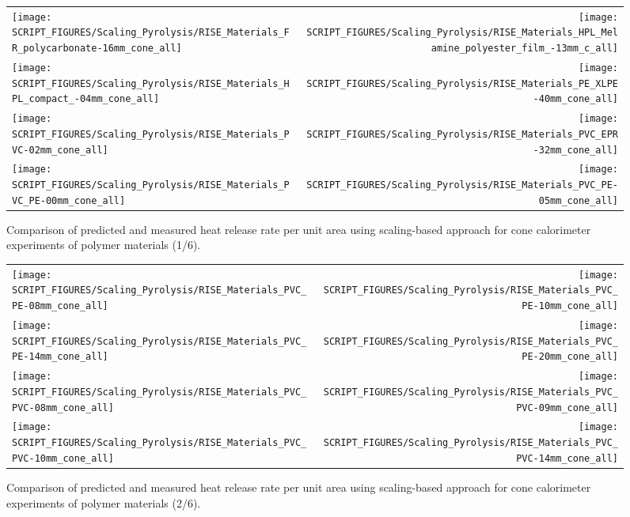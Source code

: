 \begin{figure}[!h]
\begin{tabular*}{\textwidth}{l@{\extracolsep{\fill}}r}
\texttt{[image: SCRIPT\_FIGURES/Scaling\_Pyrolysis/RISE\_Materials\_FR\_polycarbonate-16mm\_cone\_all]} &
\texttt{[image: SCRIPT\_FIGURES/Scaling\_Pyrolysis/RISE\_Materials\_HPL\_Melamine\_polyester\_film\_-13mm\_c\_all]} \\
\texttt{[image: SCRIPT\_FIGURES/Scaling\_Pyrolysis/RISE\_Materials\_HPL\_compact\_-04mm\_cone\_all]} &
\texttt{[image: SCRIPT\_FIGURES/Scaling\_Pyrolysis/RISE\_Materials\_PE\_XLPE-40mm\_cone\_all]} \\
\texttt{[image: SCRIPT\_FIGURES/Scaling\_Pyrolysis/RISE\_Materials\_PVC-02mm\_cone\_all]} &
\texttt{[image: SCRIPT\_FIGURES/Scaling\_Pyrolysis/RISE\_Materials\_PVC\_EPR-32mm\_cone\_all]} \\
\texttt{[image: SCRIPT\_FIGURES/Scaling\_Pyrolysis/RISE\_Materials\_PVC\_PE-00mm\_cone\_all]} &
\texttt{[image: SCRIPT\_FIGURES/Scaling\_Pyrolysis/RISE\_Materials\_PVC\_PE-05mm\_cone\_all]} \\
\end{tabular*}
\caption[Heat release rate per unit area of RISE materials using scaling model, polymer materials]
{Comparison of predicted and measured heat release rate per unit area using scaling-based approach for cone calorimeter experiments of polymer materials (1/6).}
\label{RISE_Materials_polymers1}
\end{figure}

\begin{figure}[!h]
\begin{tabular*}{\textwidth}{l@{\extracolsep{\fill}}r}
\texttt{[image: SCRIPT\_FIGURES/Scaling\_Pyrolysis/RISE\_Materials\_PVC\_PE-08mm\_cone\_all]} &
\texttt{[image: SCRIPT\_FIGURES/Scaling\_Pyrolysis/RISE\_Materials\_PVC\_PE-10mm\_cone\_all]} \\
\texttt{[image: SCRIPT\_FIGURES/Scaling\_Pyrolysis/RISE\_Materials\_PVC\_PE-14mm\_cone\_all]} &
\texttt{[image: SCRIPT\_FIGURES/Scaling\_Pyrolysis/RISE\_Materials\_PVC\_PE-20mm\_cone\_all]} \\
\texttt{[image: SCRIPT\_FIGURES/Scaling\_Pyrolysis/RISE\_Materials\_PVC\_PVC-08mm\_cone\_all]} &
\texttt{[image: SCRIPT\_FIGURES/Scaling\_Pyrolysis/RISE\_Materials\_PVC\_PVC-09mm\_cone\_all]} \\
\texttt{[image: SCRIPT\_FIGURES/Scaling\_Pyrolysis/RISE\_Materials\_PVC\_PVC-10mm\_cone\_all]} &
\texttt{[image: SCRIPT\_FIGURES/Scaling\_Pyrolysis/RISE\_Materials\_PVC\_PVC-14mm\_cone\_all]} \\
\end{tabular*}
\caption[Heat release rate per unit area of RISE materials using scaling model, polymer materials]
{Comparison of predicted and measured heat release rate per unit area using scaling-based approach for cone calorimeter experiments of polymer materials (2/6).}
\label{RISE_Materials_polymers2}
\end{figure}

